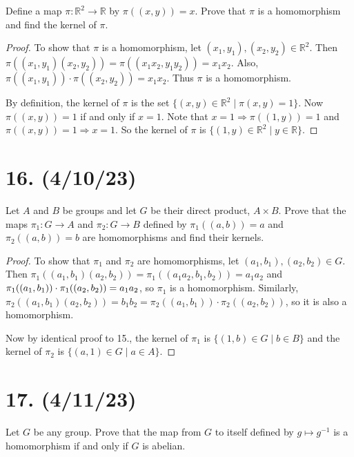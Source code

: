 \documentclass{article}
\begin{document}
Define a map $\pi: \mathbb{R}^2 \rightarrow \mathbb{R}$ by $\pi((x, y)) = x$. Prove that $\pi$ is a homomorphism and find the kernel of $\pi$.

\begin{proof}
    To show that $\pi$ is a homomorphism, let $(x_1, y_1), (x_2, y_2) \in \mathbb{R}^2$. Then $\pi((x_1, y_1)(x_2, y_2)) = \pi((x_1 x_2, y_1 y_2)) = x_1 x_2$. Also, $\pi((x_1, y_1)) \cdot \pi((x_2, y_2)) = x_1 x_2$. Thus $\pi$ is a homomorphism.

    By definition, the kernel of $\pi$ is the set $\{ (x, y) \in \mathbb{R}^2 \mid \pi(x, y) = 1 \}$. Now $\pi((x, y)) = 1$ if and only if $x = 1$. Note that $x = 1 \Rightarrow \pi((1, y)) = 1$ and $\pi((x, y)) = 1 \Rightarrow x = 1$. So the kernel of $\pi$ is $\{ (1, y) \in \mathbb{R}^2 \mid y \in \mathbb{R} \}$.
\end{proof}

\section*{16. (4/10/23)}

Let $A$ and $B$ be groups and let $G$ be their direct product, $A \times B$. Prove that the maps $\pi_1: G \rightarrow A$ and $\pi_2: G \rightarrow B$ defined by $\pi_1((a, b)) = a$ and $\pi_2((a, b)) = b$ are homomorphisms and find their kernels.

\begin{proof}
    To show that $\pi_1$ and $\pi_2$ are homomorphisms, let $(a_1, b_1), (a_2, b_2) \in G$. Then $\pi_1((a_1, b_1)(a_2, b_2)) = \pi_1((a_1 a_2, b_1, b_2)) = a_1 a_2$ and $\pi_1((a_1, b_1)) \cdot \pi_1((a_2, b_2)) \newline 
    = a_1 a_2$, so $\pi_1$ is a homomorphism. Similarly, $\pi_2((a_1, b_1)(a_2, b_2)) = b_1 b_2 = \pi_2((a_1, b_1)) \cdot \pi_2((a_2, b_2))$, so it is also a homomorphism.

    Now by identical proof to 15., the kernel of $\pi_1$ is $\{ (1, b) \in G \mid b \in B \}$ and the kernel of $\pi_2$ is $\{ (a, 1) \in G \mid a \in A \}$.
\end{proof}

\section*{17. (4/11/23)}

Let $G$ be any group. Prove that the map from $G$ to itself defined by $g \mapsto g^{-1}$ is a homomorphism if and only if $G$ is abelian.
\end{document}
